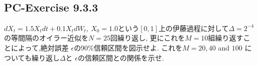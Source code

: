 \documentclass[a4paper,dvipdfmx]{jsarticle}
\newlength{\cellleftmargin}
\newlength{\smallerfontscale}
\def\smaller{\fontsize{\smallerfontscale}{\smallerfontscale}\selectfont}
\begin{document}
\par\vspace{1\smallerfontscale}%
    \begin{addmargin}[\cellleftmargin]{0em}%
    {\smaller%
    \vspace{-1\smallerfontscale}%
    
    \begin{center}
    \end{center}
    { \hspace*{\fill} \\}
    }%
    \end{addmargin}%
    \subsection{PC-Exercise 9.3.3}\label{pc-exercise-9.3.3}

\(dX_t = 1.5 X_t dt + 0.1 X_t dW_t ,\ X_0 =1.0\)という\([0,1]\)上の伊藤過程に対して\(\Delta= 2^{-4}\)の等間隔のオイラー近似を\(N=25\)回繰り返し,
更にこれを\(M=10\)組繰り返すことによって,絶対誤差
\(\epsilon\)の90\%信頼区間を図示せよ. これを\(M = 20, 40\) and \(100\)
についても繰り返し\(\Delta\)と \(\epsilon\)の信頼区間との関係を示せ.

\end{document}
